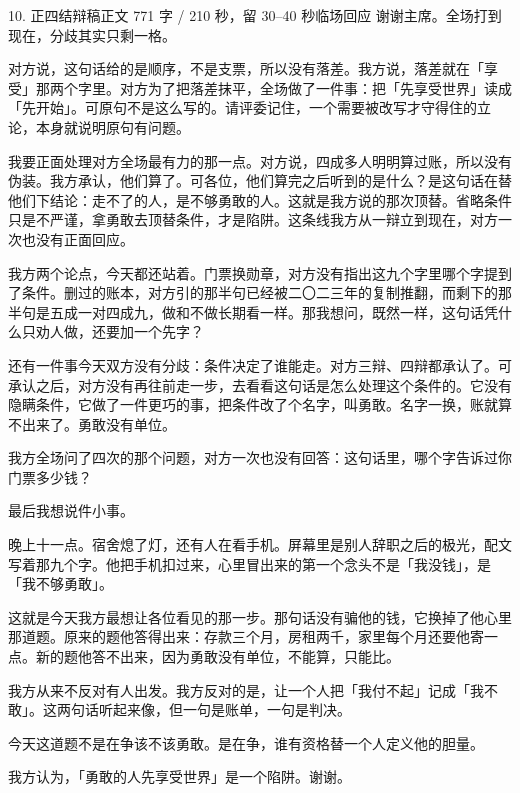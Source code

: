 \documentclass[script,pro]{debate}
\begin{document}
\begin{speech}{10. 正四结辩稿}{正文 771 字 / 210 秒，留 30–40 秒临场回应}
谢谢主席。全场打到现在，分歧其实只剩一格。

对方说，这句话给的是顺序，不是支票，所以没有落差。我方说，落差就在「享受」那两个字里。对方为了把落差抹平，全场做了一件事：把「先享受世界」读成「先开始」。可原句不是这么写的。请评委记住，一个需要被改写才守得住的立论，本身就说明原句有问题。

我要正面处理对方全场最有力的那一点。对方说，四成多人明明算过账，所以没有伪装。我方承认，他们算了。可各位，他们算完之后听到的是什么？是这句话在替他们下结论：走不了的人，是不够勇敢的人。这就是我方说的那次顶替。省略条件只是不严谨，拿勇敢去顶替条件，才是陷阱。这条线我方从一辩立到现在，对方一次也没有正面回应。

我方两个论点，今天都还站着。门票换勋章，对方没有指出这九个字里哪个字提到了条件。删过的账本，对方引的那半句已经被二〇二三年的复制推翻，而剩下的那半句是五成一对四成九，做和不做长期看一样。那我想问，既然一样，这句话凭什么只劝人做，还要加一个先字？

还有一件事今天双方没有分歧：条件决定了谁能走。对方三辩、四辩都承认了。可承认之后，对方没有再往前走一步，去看看这句话是怎么处理这个条件的。它没有隐瞒条件，它做了一件更巧的事，把条件改了个名字，叫勇敢。名字一换，账就算不出来了。勇敢没有单位。

我方全场问了四次的那个问题，对方一次也没有回答：这句话里，哪个字告诉过你门票多少钱？

最后我想说件小事。

晚上十一点。宿舍熄了灯，还有人在看手机。屏幕里是别人辞职之后的极光，配文写着那九个字。他把手机扣过来，心里冒出来的第一个念头不是「我没钱」，是「我不够勇敢」。

这就是今天我方最想让各位看见的那一步。那句话没有骗他的钱，它换掉了他心里那道题。原来的题他答得出来：存款三个月，房租两千，家里每个月还要他寄一点。新的题他答不出来，因为勇敢没有单位，不能算，只能比。

我方从来不反对有人出发。我方反对的是，让一个人把「我付不起」记成「我不敢」。这两句话听起来像，但一句是账单，一句是判决。

今天这道题不是在争该不该勇敢。是在争，谁有资格替一个人定义他的胆量。

我方认为，「勇敢的人先享受世界」是一个陷阱。谢谢。
\end{speech}
\begin{contingency}
\end{contingency}
\end{document}
